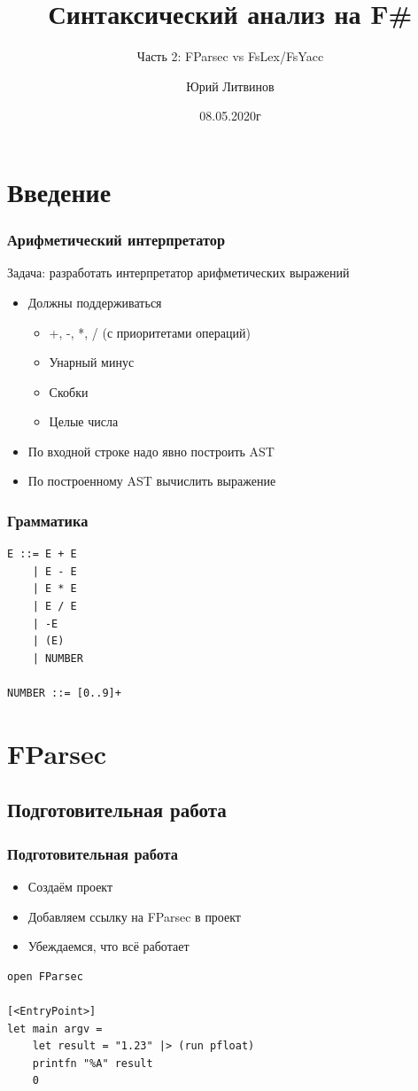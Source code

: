 \documentclass[xetex,mathserif,serif]{beamer}
\title{Синтаксический анализ на F\#}
\subtitle{Часть 2: FParsec vs FsLex/FsYacc}
\author{Юрий Литвинов}
\date{08.05.2020г}
\begin{document}
    
    \frame{\titlepage}

    \section{Введение}
    
    \begin{frame}
        \frametitle{Арифметический интерпретатор}
        Задача: разработать интерпретатор арифметических выражений
        \begin{itemize}
            \item Должны поддерживаться 
            \begin{itemize}
                \item +, -, *, / (с приоритетами операций)
                \item Унарный минус
                \item Скобки
                \item Целые числа
            \end{itemize}
            \item По входной строке надо явно построить AST
            \item По построенному AST вычислить выражение
        \end{itemize}
    \end{frame}

    \begin{frame}[fragile]
        \frametitle{Грамматика}
        \begin{verbatim}
E ::= E + E
    | E - E
    | E * E
    | E / E
    | -E
    | (E)
    | NUMBER

NUMBER ::= [0..9]+
        \end{verbatim}
    \end{frame}

    \section{FParsec}

    \subsection{Подготовительная работа}

    \begin{frame}[fragile]
        \frametitle{Подготовительная работа}
        \begin{itemize}
            \item Создаём проект
            \item Добавляем ссылку на FParsec в проект
            \item Убеждаемся, что всё работает
        \end{itemize}
        \begin{verbatim}
open FParsec

[<EntryPoint>]
let main argv =
    let result = "1.23" |> (run pfloat)
    printfn "%A" result
    0 
        \end{verbatim}
    \end{frame}
\end{document}
